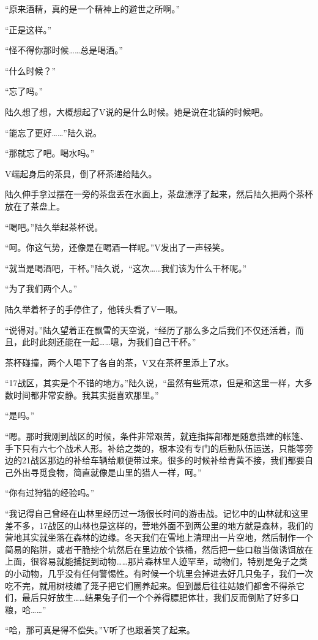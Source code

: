 “原来酒精，真的是一个精神上的避世之所啊。”

“正是这样。”

“怪不得你那时候……总是喝酒。”

“什么时候？”

“忘了吗。”

陆久想了想，大概想起了V说的是什么时候。她是说在北镇的时候吧。

“能忘了更好……”陆久说。

“那就忘了吧。喝水吗。”

V端起身后的茶具，倒了杯茶递给陆久。

陆久伸手拿过摆在一旁的茶盘丢在水面上，茶盘漂浮了起来，然后陆久把两个茶杯放在了茶盘上。

“喝吧。”陆久举起茶杯说。

“呵。你这气势，还像是在喝酒一样呢。”V发出了一声轻笑。

“就当是喝酒吧，干杯。”陆久说，“这次……我们该为什么干杯呢。”

“为了我们两个人。”

陆久举着杯子的手停住了，他转头看了V一眼。

“说得对。”陆久望着正在飘雪的天空说，“经历了那么多之后我们不仅还活着，而且，此时此刻还能在一起……嗯，为我们自己干杯。”

茶杯碰撞，两个人喝下了各自的茶，V又在茶杯里添上了水。

“17战区，其实是个不错的地方。”陆久说，“虽然有些荒凉，但是和这里一样，大多数时间都非常安静。我其实挺喜欢那里。”

“是吗。”

“嗯。那时我刚到战区的时候，条件非常艰苦，就连指挥部都是随意搭建的帐篷、手下只有六七个战术人形。补给之类的，根本没有专门的后勤队伍运送，只能等旁边的21战区那边的补给车辆给顺便带过来。很多的时候补给青黄不接，我们都要自己外出寻觅食物，简直就像是山里的猎人一样，呵。”

“你有过狩猎的经验吗。”

“我记得自己曾经在山林里经历过一场很长时间的游击战。记忆中的山林就和这里差不多，17战区的山林也是这样的，营地外面不到两公里的地方就是森林，我们的营地其实就坐落在森林的边缘。冬天我们在雪地上清理出一片空地，然后制作一个简易的陷阱，或者干脆挖个坑然后在里边放个铁桶，然后把一些口粮当做诱饵放在上面，很容易就能捕捉到动物……那片森林里人迹罕至，动物们，特别是兔子之类的小动物，几乎没有任何警惕性。有时候一个坑里会掉进去好几只兔子，我们一次吃不完，就用树枝编了笼子把它们圈养起来。但到最后往往姑娘们都舍不得杀它们，最后只好放生……结果兔子们一个个养得膘肥体壮，我们反而倒贴了好多口粮，哈……”

“哈，那可真是得不偿失。”V听了也跟着笑了起来。

